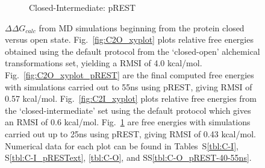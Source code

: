 \documentclass[journal=jctcce,manuscript=article]{achemso}
\begin{document}
\begin{figure}[!ht]
\begin{subfigure}{.5\textwidth}
   \caption{Closed-Intermediate: pREST}
   \label{fig:C2I_xyplot_pREST}
\end{subfigure}\hfill
\caption{$\Delta\Delta G_{calc}$ from MD simulations beginning from the protein closed versus open state. 
Fig.~\ref{fig:C2O_xyplot} plots relative free energies obtained using the default protocol from the `closed-open' alchemical transformations set, yielding a RMSI of 4.0 kcal/mol. 
Fig.~\ref{fig:C2O_xyplot_pREST} are the final computed free energies with simulations carried out to 55ns using pREST, giving RMSI of 0.57 kcal/mol. 
Fig.~\ref{fig:C2I_xyplot} plots relative free energies from the `closed-intermediate' set using the default protocol which gives an RMSI of 0.6 kcal/mol. 
Fig.~\ref{fig:C2I_xyplot_pREST} are free energies with simulations carried out up to 25ns using pREST, giving RMSI of 0.43 kcal/mol. 
Numerical data for each plot can be found in Tables~S\ref{tbl:C-I}, S\ref{tbl:C-I_pRESText}, \ref{tbl:C-O}, and SS\ref{tbl:C-O_pREST-40-55ns}.
}
\label{fig:conf-xyplots}
\end{figure}
\end{document}
